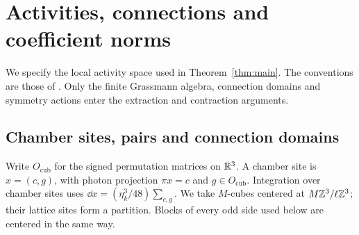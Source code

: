 \section{Activities, connections and coefficient norms}
\label{sec:activities}

We specify the local activity space used in Theorem~\ref{thm:main}.
The conventions are those of \cite[\S12.1]{QED3Manuscript}.
Only the finite Grassmann algebra, connection domains and symmetry
actions enter the extraction and contraction arguments.

\subsection{Chamber sites, pairs and connection domains}

Write \(O_{\mathrm{cub}}\) for the signed permutation matrices on
\(\mathbb R^3\). A chamber site is \(x=(c,g)\), with photon projection
\(\pi x=c\) and \(g\in O_{\mathrm{cub}}\). Integration over chamber
sites uses \(\dd x=(\eta_k^3/48)\sum_{c,g}\). We take
\(M\)-cubes centered at \(M\mathbb Z^3/\ell\mathbb Z^3\); their lattice sites
form a partition. Blocks of every odd side used below are centered
in the same way.

